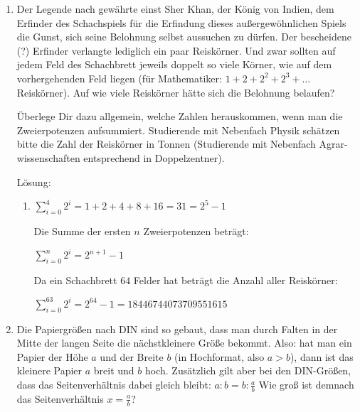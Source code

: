 \documentclass[main.tex]{subfiles}
\begin{document}
\begin{enumerate}
	\item Der Legende nach gewährte einst Sher Khan, der König von Indien, dem Erfinder des Schachspiels für
	      die Erfindung dieses außergewöhnlichen Spiels die Gunst, sich seine Belohnung selbst aussuchen zu dürfen.
	      Der bescheidene (?) Erfinder verlangte lediglich ein paar Reiskörner.
	      Und zwar sollten auf jedem Feld des Schachbrett jeweils doppelt so viele Körner,
	      wie auf dem vorhergehenden Feld liegen (für Mathematiker:
	      \(
	      1 + 2 + 2^2 + 2^3 + \dots
	      \)
	      Reiskörner). Auf wie viele Reiskörner hätte sich die Belohnung belaufen?

	      Überlege Dir dazu allgemein, welche Zahlen herauskommen, wenn man die
	      Zweierpotenzen aufsummiert. Studierende mit Nebenfach Physik schätzen
	      bitte die Zahl der Reiskörner in Tonnen (Studierende mit Nebenfach Agrar-
	      wissenschaften entsprechend in Doppelzentner).

	      Lösung:
	      \begin{enumerate}
		      \item
		            \(
		            \sum_{i=0}^{4} 2^i = 1 + 2 + 4 + 8 + 16 = 31 = 2^5 - 1
		            \)

		            Die Summe der ersten
		            \( n \)
		            Zweierpotenzen beträgt:

		            \(
		            \sum_{i=0}^{n} 2^i = 2^{n+1} - 1
		            \)

		            Da ein Schachbrett \(
		            64
		            \) Felder hat beträgt die Anzahl aller Reiskörner:

		            \(
		            \sum_{i=0}^{63} 2^i = 2^{64} - 1 = 18446744073709551615
		            \)
	      \end{enumerate}
	\item Die Papiergrößen nach DIN sind so gebaut, dass man durch Falten in der
	      Mitte der langen Seite die nächstkleinere Größe bekommt. Also: hat man ein
	      Papier der  Höhe \( a \)
	      und der Breite
	      \(
	      b
	      \)
	      (in Hochformat, also \(
	      a > b
	      \)),
	      dann ist
	      das kleinere Papier \(
	      a
	      \) breit und \(
	      b
	      \) hoch. Zusätzlich gilt aber bei den DIN-Größen,
	      dass das Seitenverhältnis dabei gleich bleibt:
	      \(
	      a : b = b : \frac{a}{b}
	      \) Wie groß ist demnach das Seitenverhältnis
	      \(
	      x = \frac{a}{b}
	      \)?


\end{enumerate}
\end{document}
